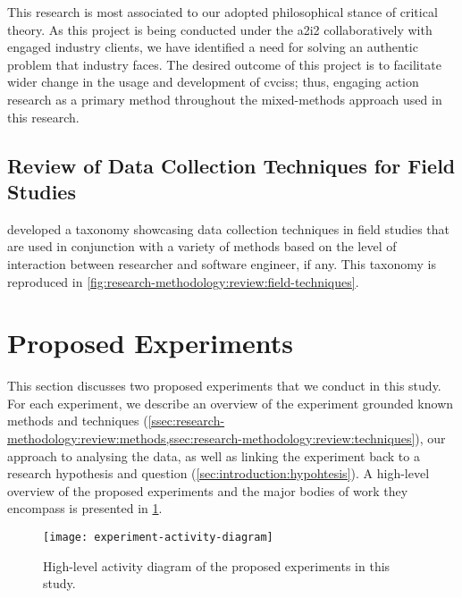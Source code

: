 This research is most associated to our adopted philosophical stance of critical theory. As this project is being conducted under the \gls{a2i2} collaboratively with engaged industry clients, we have identified a need for solving an authentic problem that industry faces. The desired outcome of this project is to facilitate wider change in the usage and development of \glspl{cvcis}; thus, engaging action research as a primary method throughout the mixed-methods approach used in this research.

\subsection{Review of Data Collection Techniques for Field Studies}
\label{ssec:research-methodology:review:techniques}

\citeauthor{Singer:2007tu} developed a taxonomy \citep{Singer:2007tu,Lethbridge:2005jv} showcasing data collection techniques in field studies that are used in conjunction with a variety of methods based on the level of interaction between researcher and software engineer, if any. This taxonomy is reproduced in \cref{fig:research-methodology:review:field-techniques}.

\section{Proposed Experiments}
\label{sec:research-methodology:experiments}

This section discusses two proposed experiments that we conduct in this study. For each experiment, we describe an overview of the experiment grounded known methods and techniques (\cref{ssec:research-methodology:review:methods,ssec:research-methodology:review:techniques}), our approach to analysing the data, as well as linking the experiment back to a research hypothesis and question (\cref{sec:introduction:hypohtesis}). A high-level overview of the proposed experiments and the major bodies of work they encompass is presented in \cref{fig:research-methodology:review:activity-diagram}.

\begin{figure}[t!]
  \centering
  \texttt{[image: experiment-activity-diagram]}
  \caption[High-level overview of the proposed experiments]{High-level activity diagram of the proposed experiments in this study.}
  \label{fig:research-methodology:review:activity-diagram}
\end{figure}



